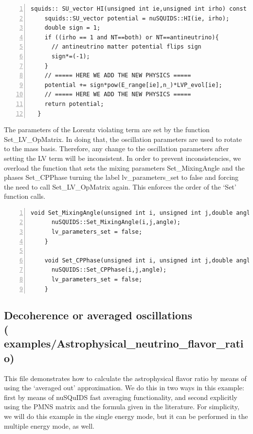 \documentclass[3p,12pt]{elsarticle}
\newcommand{\ttf}{\ttfamily}
\begin{document}
\begin{lstlisting}[frame=leftline, numbers =
  left,breaklines=true,label = ex:sin1,firstnumber=last]
  squids:: SU_vector HI(unsigned int ie,unsigned int irho) const {
    squids::SU_vector potential = nuSQUIDS::HI(ie, irho);
    double sign = 1;
    if ((irho == 1 and NT==both) or NT==antineutrino){
      // antineutrino matter potential flips sign
      sign*=(-1);
    }
    // ===== HERE WE ADD THE NEW PHYSICS =====
    potential += sign*pow(E_range[ie],n_)*LVP_evol[ie]; 
    // ===== HERE WE ADD THE NEW PHYSICS =====
    return potential;
  }
\end{lstlisting}

The parameters of the Lorentz violating term are set by the function
{\ttf Set\_LV\_OpMatrix}. In doing that, the oscillation parameters are
used to rotate to the mass basis. Therefore, any change to the
oscillation parameters after setting the LV term will be inconsistent.
In order to prevent inconsistencies, we overload the function that sets
the mixing parameters {\ttf Set\_MixingAngle} and the phases {\ttf
  Set\_CPPhase} turning the label {\ttf lv\_parameters\_set} to {\ttf
  false} and forcing the need to call {\ttf Set\_LV\_OpMatrix} again.
This enforces the order of the `Set' function calls.

\begin{lstlisting}[frame=leftline, numbers =
  left,breaklines=true,label = ex:sin1,firstnumber=last]
    void Set_MixingAngle(unsigned int i, unsigned int j,double angle){
      nuSQUIDS::Set_MixingAngle(i,j,angle);
      lv_parameters_set = false;
    }

    void Set_CPPhase(unsigned int i, unsigned int j,double angle){
      nuSQUIDS::Set_CPPhase(i,j,angle);
      lv_parameters_set = false;
    }
\end{lstlisting}

\subsection{Decoherence or averaged oscillations\\ \textnormal{({\ttf
      examples/Astrophysical\_neutrino\_flavor\_ratio})}}

This file demonstrates how to calculate the astrophysical flavor ratio by means
of using the `averaged out' approximation. We do this in two ways in this
example: first by means of nuSQuIDS fast averaging functionality, 
and second explicitly using the PMNS matrix and the formula given in the literature.
For simplicity, we will do this example in the single energy mode, but it
can be performed in the multiple energy mode, as well.
\end{document}

